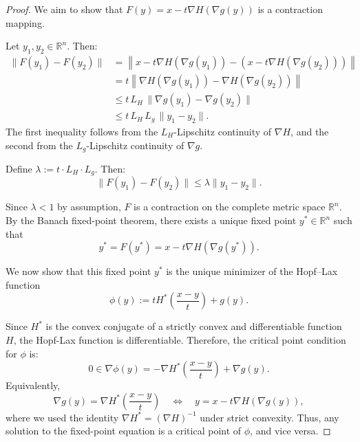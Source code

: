 \documentclass[review,hidelinks,onefignum,onetabnum]{siamart250106}
\begin{document}
\begin{proof}
We aim to show that \( F(y) = x - t \nabla H(\nabla g(y)) \) is a contraction mapping.

Let \( y_1, y_2 \in \mathbb{R}^n \). Then:
\begin{align*}
\|F(y_1) - F(y_2)\| 
&= \left\| x - t \nabla H(\nabla g(y_1)) - \left( x - t \nabla H(\nabla g(y_2)) \right) \right\| \\
&= t \left\| \nabla H(\nabla g(y_1)) - \nabla H(\nabla g(y_2)) \right\| \\
&\leq t\, L_H \, \|\nabla g(y_1) - \nabla g(y_2)\| \\
&\leq t\, L_H\, L_g\, \|y_1 - y_2\|.
\end{align*}
The first inequality follows from the \(L_H\)-Lipschitz continuity of \(\nabla H\),
and the second from the \(L_g\)-Lipschitz continuity of \(\nabla g\).

Define \( \lambda := t \cdot L_H \cdot L_g \). Then:
\[
\|F(y_1) - F(y_2)\| \leq \lambda \|y_1 - y_2\|.
\]

Since \( \lambda < 1 \) by assumption, \( F \) is a contraction on the complete metric space \( \mathbb{R}^n \). By the Banach fixed-point theorem, there exists a unique fixed point \( y^* \in \mathbb{R}^n \) such that
\[
y^* = F(y^*) = x - t \nabla H(\nabla g(y^*)).
\]


We now show that this fixed point \( y^* \) is the unique minimizer of the Hopf--Lax function
\[
\phi(y) := t H^*\left( \frac{x - y}{t} \right) + g(y).
\]

Since \( H^* \) is the convex conjugate of a strictly convex and differentiable function \( H \), the Hopf-Lax function is differentiable.
Therefore, the critical point condition for \( \phi \) is:
\[
0 \in \nabla \phi(y) = - \nabla H^*\left( \frac{x - y}{t} \right) + \nabla g(y).
\]
Equivalently,
\[
\nabla g(y) = \nabla H^*\left( \frac{x - y}{t} \right)
\quad \Longleftrightarrow \quad y = x - t \nabla H(\nabla g(y)),
\]
where we used the identity \( \nabla H^* = (\nabla H)^{-1} \) under strict convexity.
Thus, any solution to the fixed-point equation is a critical point of \( \phi \), and vice versa.


\end{proof}
\end{document}
